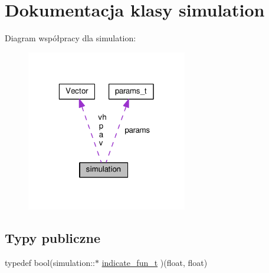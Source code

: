 \hypertarget{classsimulation}{\section{Dokumentacja klasy simulation}
\label{classsimulation}
}


Diagram współpracy dla simulation\-:\nopagebreak
\begin{figure}[H]
\begin{center}
\leavevmode
\includegraphics[width=199pt]{classsimulation__coll__graph}
\end{center}
\end{figure}
\subsection*{Typy publiczne}
\begin{DoxyCompactItemize}
\item 
typedef bool(simulation\-::$\ast$ \hyperlink{classsimulation_ab63cd8ab861eb5f0096982628dca37dc}{indicate\-\_\-fun\-\_\-t} )(float, float)
\end{DoxyCompactItemize}
